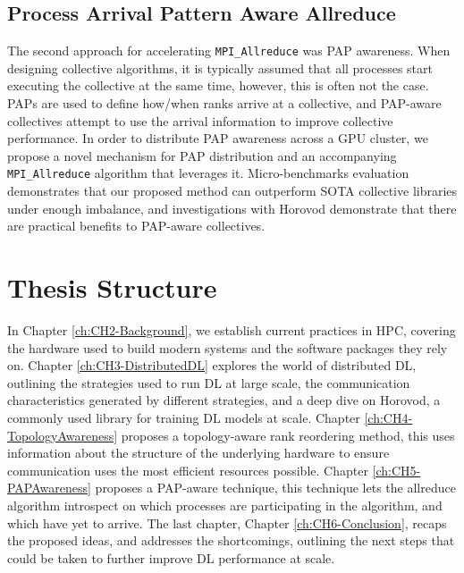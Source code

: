\subsection{Process Arrival Pattern Aware Allreduce}
The second approach for accelerating \texttt{MPI\_Allreduce} was \gls{PAP} awareness.
When designing collective algorithms, it is typically assumed that all processes start executing the collective at the same time, however, this is often not the case.
\gls{PAP}s are used to define how/when ranks arrive at a collective, and \gls{PAP}-aware collectives attempt to use the arrival information to improve collective performance. 
In order to distribute \gls{PAP} awareness across a \gls{GPU} cluster, we propose a novel mechanism for \gls{PAP} distribution and an accompanying \texttt{MPI\_Allreduce} algorithm that leverages it.
Micro-benchmarks evaluation demonstrates that our proposed method can outperform \gls{SOTA} collective libraries under enough imbalance, and investigations with Horovod demonstrate that there are practical benefits to \gls{PAP}-aware collectives.

\section{Thesis Structure}
In Chapter \ref{ch:CH2-Background}, we establish current practices in \gls{HPC}, covering the hardware used to build modern systems and the software packages they rely on.
Chapter \ref{ch:CH3-DistributedDL} explores the world of distributed \gls{DL}, outlining the strategies used to run \gls{DL} at large scale, the communication characteristics generated by different strategies, and a deep dive on Horovod, a commonly used library for training \gls{DL} models at scale.
Chapter \ref{ch:CH4-TopologyAwareness} proposes a topology-aware rank reordering method, this uses information about the structure of the underlying hardware to ensure communication uses the most efficient resources possible.
Chapter \ref{ch:CH5-PAPAwareness} proposes a \gls{PAP}-aware technique, this technique lets the allreduce algorithm introspect on which processes are participating in the algorithm, and which have yet to arrive.
The last chapter, Chapter \ref{ch:CH6-Conclusion}, recaps the proposed ideas, and addresses the shortcomings, outlining the next steps that could be taken to further improve \gls{DL} performance at scale.